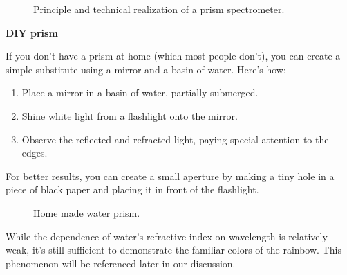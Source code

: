 \documentclass[
  a4paper,
]{book}
\providecommand{\tightlist}{%
  \setlength{\itemsep}{0pt}\setlength{\parskip}{0pt}}
\begin{document}
\begin{figure}
\begin{minipage}{0.50\linewidth}
{}


\end{minipage}%

\caption{\label{fig-prism-spectrometer}Principle and technical
realization of a prism spectrometer.}

\end{figure}%

\textbf{DIY prism}

If you don't have a prism at home (which most people don't), you can
create a simple substitute using a mirror and a basin of water. Here's
how:

\begin{enumerate}
\def\labelenumi{\arabic{enumi}.}
\tightlist
\item
  Place a mirror in a basin of water, partially submerged.
\item
  Shine white light from a flashlight onto the mirror.
\item
  Observe the reflected and refracted light, paying special attention to
  the edges.
\end{enumerate}

For better results, you can create a small aperture by making a tiny
hole in a piece of black paper and placing it in front of the
flashlight.

\begin{figure}


\caption{\label{fig-diy-prism}Home made water prism.}

\end{figure}%

While the dependence of water's refractive index on wavelength is
relatively weak, it's still sufficient to demonstrate the familiar
colors of the rainbow. This phenomenon will be referenced later in our
discussion.
\end{document}
